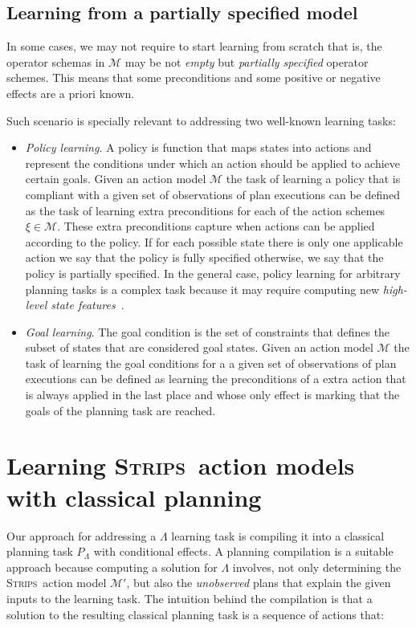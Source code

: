 \documentclass[3p,times]{elsarticle}
\newcommand{\strips}{\textsc{Strips}}     %
\begin{document}
\subsection{Learning from a partially specified model}
In some cases, we may not require to start learning from scratch that is, the operator schemas in $\mathcal{M}$ may be not {\em empty} but {\em partially specified} operator schemes. This means that some preconditions and some positive or negative effects are a priori known.

Such scenario is specially relevant to addressing two well-known learning tasks:
\begin{itemize}
\item {\em Policy learning}. A policy is function that maps states into actions and represent the conditions under which an action should be applied to achieve certain goals. Given an action model $\mathcal{M}$ the task of learning a policy that is compliant with a given set of observations of plan executions can be defined as the task of learning extra preconditions for each of the action schemes $\xi\in\mathcal{M}$. These extra preconditions capture when actions can be applied according to the policy. If for each possible state there is only one applicable action we say that the policy is fully specified otherwise, we say that the policy is partially specified. In the general case, policy learning for arbitrary planning tasks is a complex task because it may require computing new {\em high-level state features}~\cite{lotinac2016automatic}.

  
\item {\em Goal learning}. The goal condition is the set of constraints that defines the subset of states that are considered goal states. Given an action model $\mathcal{M}$ the task of learning the goal conditions for a a given set of observations of plan executions can be defined as learning the preconditions of a extra action that is always applied in the last place and whose only effect is marking that the goals of the planning task are reached.
\end{itemize}
  


\section{Learning \strips\ action models with classical planning}
\label{sec:Section5}
Our approach for addressing a $\Lambda$ learning task is compiling it into a classical planning task $P_{\Lambda}$ with conditional effects. A planning compilation is a suitable approach because computing a solution for $\Lambda$ involves, not only determining the \strips\ action model $\mathcal{M}'$, but also the {\em unobserved} plans that explain the given inputs to the learning task. The intuition behind the compilation is that a solution to the resulting classical planning task is a sequence of actions that:
\end{document}

